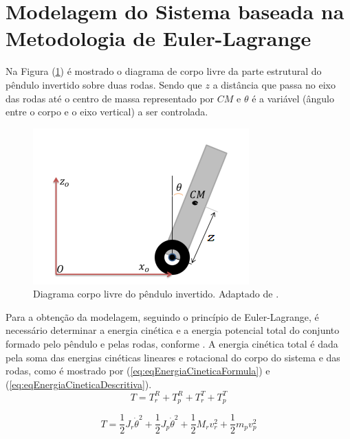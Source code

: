 \section{Modelagem do Sistema baseada na Metodologia de Euler-Lagrange}\label{sec:EquaçõesMovimentoEstrutura}

Na Figura (\ref{fig:M-pendulo}) é mostrado o diagrama de corpo livre da parte estrutural do pêndulo invertido sobre duas rodas. Sendo que $z$ a distância que passa no eixo das rodas até o centro de massa representado por $CM$ e $\theta$ é a variável (ângulo entre o corpo e o eixo vertical) a ser controlada.
\begin{figure}[H]
		\centering
		\includegraphics[scale=0.95]{Modelagem/RepresentacaoPendulo.png}
		\caption{Diagrama corpo livre do pêndulo invertido. Adaptado de \citep{Silva:17}.}
		\label{fig:M-pendulo}
\end{figure}  

Para a obtenção da modelagem, seguindo o princípio de Euler-Lagrange, é necessário determinar a energia cinética e a energia potencial total do conjunto formado pelo pêndulo e pelas rodas, conforme \cite{Faria:15}. A energia cinética total é dada pela soma das energias cinéticas lineares e rotacional do corpo do sistema e das rodas, como é mostrado por (\ref{eq:eqEnergiaCineticaFormula}) e (\ref{eq:eqEnergiaCineticaDescritiva}).
\begin{equation}\label{eq:eqEnergiaCineticaFormula}
    T = T_{\textit{r}}^{\textit{R}} + T_{\textit{p}}^{\textit{R}} + T_{\textit{r}}^{\textit{T}} + T_{\textit{p}}^{\textit{T}}
\end{equation}

\begin{equation}\label{eq:eqEnergiaCineticaDescritiva}
    T = \frac{1}{2}J_{r}\dot{\theta}^2 + \frac{1}{2}J_{p}\dot{\theta}^2 + \frac{1}{2}M_r\textit{v}_{r}^2 + \frac{1}{2}m_p\textit{v}_{p}^2
\end{equation}

